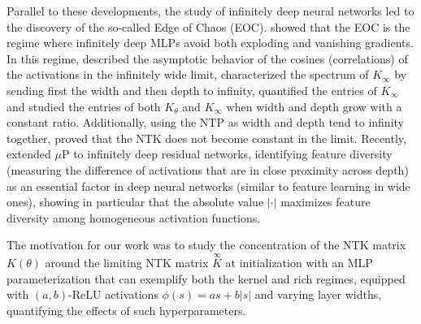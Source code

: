 \documentclass[twoside,11pt]{article}
\newcommand{\limiting}[1]{\overset{\scriptscriptstyle\infty}{#1}}
\begin{document}
Parallel to these developments, the study of infinitely deep neural networks led \citet{Pooleetal2016} to the discovery of the so-called Edge of Chaos (EOC). \citet{Schoenholzetal2017} showed that the EOC is the regime where infinitely deep MLPs avoid both exploding and vanishing gradients. In this regime, \citet{Hayouetal2019} described the asymptotic behavior of the cosines (correlations) of the activations in the infinitely wide limit, \citet{Xiaoetal2020} characterized the spectrum of $K_\infty$ by sending first the width and then depth to infinity, \citet{Hayouetal2022} quantified the entries of $K_\infty$ and \citet{Seleznovaetal22} studied the entries of both $K_\theta$ and $K_\infty$ when width and depth grow with a constant ratio. Additionally, using the NTP as width and depth tend to infinity together, \citet{Haninetal2020} proved that the NTK does not become constant in the limit. Recently, \citet{Yangetal2024} extended $\mu$P to infinitely deep residual networks, identifying feature diversity (measuring the difference of activations that are in close proximity across depth) as an essential factor in deep neural networks (similar to feature learning in wide ones), showing in particular that the absolute value $\vert\cdot\vert$ maximizes feature diversity among homogeneous activation functions.

The motivation for our work was to study the concentration of the NTK matrix $K(\theta)$ around the limiting NTK matrix $\limiting{K}$ at initialization with an MLP parameterization that can exemplify both the kernel and rich regimes, equipped with $(a,b)$-ReLU activations $\phi(s) = a s + b \vert s \vert$ and varying layer widths, quantifying the effects of such hyperparameters.
\end{document}
